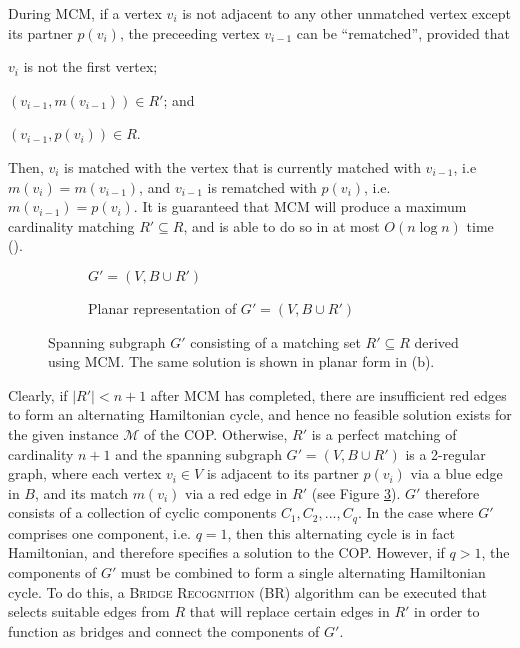 \documentclass[oribibl]{llncs}
\begin{document}
During MCM, if a vertex $v_i$ is not adjacent to any other unmatched vertex except its partner $p(v_i)$, the preceeding vertex $v_{i-1}$ can be ``rematched'', provided that 
\begin{enumerate*}[label={(\alph*)}]
	\item $v_i$ is not the first vertex; 
	\item $(v_{i-1}, m(v_{i-1})) \in R'$; and
	\item $(v_{i-1}, p(v_i)) \in R$.
\end{enumerate*}
Then, $v_i$ is matched with the vertex that is currently matched with $v_{i-1}$, i.e $m(v_i) = m(v_{i-1})$, and $v_{i-1}$ is rematched with $p(v_i)$, i.e. $m(v_{i-1}) = p(v_i)$. It is guaranteed that MCM will produce a maximum cardinality matching $R' \subseteq R$, and is able to do so in at most $O(n \log n)$ time (\citealp{mahadev1994}).

\begin{figure}	
	\centering
	\begin{subfigure}[h]{0.4\textwidth}
		
		\caption{$G' = (V, B \cup R')$}	
		\label{fig:matching}
	\end{subfigure} \quad
	\begin{subfigure}[h]{0.55\textwidth}
		
		\caption{Planar representation of $G' =(V, B \cup R')$}	
		\label{fig:mps}
	\end{subfigure}
	\caption{Spanning subgraph $G'$ consisting of a matching set $R' \subseteq R$ derived using MCM. The same solution is shown in planar form in (b).}
	\label{fig:matching/mps}
\end{figure}

Clearly, if $|R'| < n+1$ after MCM has completed, there are insufficient red edges to form an alternating Hamiltonian cycle, and hence no feasible solution exists for the given instance $\mathcal{M}$ of the COP. Otherwise, $R'$ is a perfect matching of cardinality $n+1$ and the spanning subgraph $G'=(V, B \cup R')$ is a 2-regular graph, where each vertex $v_i \in V$ is adjacent to its partner $p(v_i)$ via a blue edge in $B$, and its match $m(v_i)$ via a red edge in $R'$ (see Figure \ref{fig:matching/mps}). $G'$ therefore consists of a collection of cyclic components $C_1, C_2, ..., C_q$. In the case where $G'$ comprises one component, i.e. $q = 1$, then this alternating cycle is in fact Hamiltonian, and therefore specifies a solution to the COP. However, if $q > 1$, the components of $G'$ must be combined to form a single alternating Hamiltonian cycle. To do this, a \textsc{Bridge Recognition} (BR) algorithm can be executed that selects suitable edges from $R$ that will replace certain edges in $R'$ in order to function as bridges and connect the components of $G'$.
\end{document}
